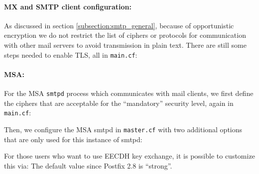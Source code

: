 



\paragraph{MX and SMTP client configuration:}
As discussed in section \ref{subsection:smtp_general}, because of opportunistic
encryption we do not restrict the list of ciphers or protocols for communication
with other mail servers to avoid transmission in plain text. There are still
some steps needed to enable TLS, all in \verb|main.cf|:


\paragraph{MSA:}
For the MSA \verb|smtpd| process which communicates with mail clients, we first
define the ciphers that are acceptable for the ``mandatory'' security level,
again in \verb|main.cf|:


Then, we configure the MSA smtpd in \verb|master.cf| with two
additional options that are only used for this instance of smtpd:


For those users who want to use EECDH key exchange, it is possible to customize this via:
The default value since Postfix 2.8 is ``strong''.

